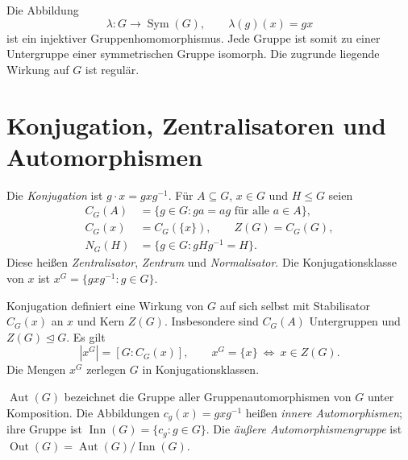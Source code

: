 \begin{theorem}
\label{b40guide:thm:cayley}
Die Abbildung
\[
 \lambda:G\longrightarrow\operatorname{Sym}(G),\qquad
 \lambda(g)(x)=gx
\]
ist ein injektiver Gruppenhomomorphismus. Jede Gruppe ist somit
zu einer Untergruppe einer symmetrischen Gruppe isomorph.
Die zugrunde liegende Wirkung auf $G$ ist regulär.
\cite{milne}
\end{theorem}

\section{Konjugation, Zentralisatoren und Automorphismen}

\begin{definition}
\label{b40guide:def:conjugation}
Die \emph{Konjugation} ist $g\cdot x=gxg^{-1}$.
Für $A\subseteq G$, $x\in G$ und $H\leq G$ seien
\[
 \begin{aligned}
 C_G(A)&=\{g\in G:ga=ag\text{ für alle }a\in A\},\\
 C_G(x)&=C_G(\{x\}),\qquad Z(G)=C_G(G),\\
 N_G(H)&=\{g\in G:gHg^{-1}=H\}.
 \end{aligned}
\]
Diese heißen \emph{Zentralisator}, \emph{Zentrum} und \emph{Normalisator}.
Die Konjugationsklasse von $x$ ist
$x^G=\{gxg^{-1}:g\in G\}$.
\end{definition}

\begin{theorem}
\label{b40guide:thm:conjugation-orbits}
Konjugation definiert eine Wirkung von $G$ auf sich selbst mit
Stabilisator $C_G(x)$ an $x$ und Kern $Z(G)$.
Insbesondere sind $C_G(A)$ Untergruppen und $Z(G)\trianglelefteq G$.
Es gilt
\[
 |x^G|=[G:C_G(x)],\qquad
 x^G=\{x\}\ \Longleftrightarrow\ x\in Z(G).
\]
Die Mengen $x^G$ zerlegen $G$ in Konjugationsklassen.
\cite{milne,conradconj}
\end{theorem}

\begin{definition}
\label{b40guide:def:inner-outer}
$\operatorname{Aut}(G)$ bezeichnet die Gruppe aller Gruppenautomorphismen
von $G$ unter Komposition. Die Abbildungen
$c_g(x)=gxg^{-1}$ heißen \emph{innere Automorphismen}; ihre Gruppe ist
$\operatorname{Inn}(G)=\{c_g:g\in G\}$.
Die \emph{äußere Automorphismengruppe} ist
$\operatorname{Out}(G)=\operatorname{Aut}(G)/\operatorname{Inn}(G)$.
\end{definition}

